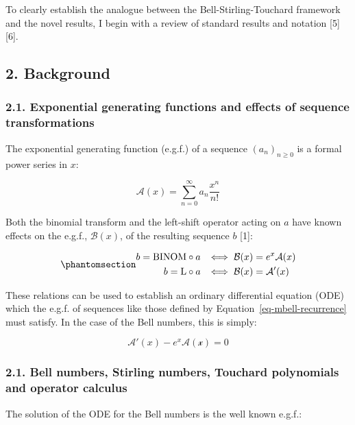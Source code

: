 \documentclass[
  letterpaper,
  DIV=11,
  numbers=noendperiod]{scrartcl}
\theoremstyle{plain}
\theoremstyle{remark}
\begin{document}
To clearly establish the analogue between the Bell-Stirling-Touchard
framework and the novel results, I begin with a review of standard
results and notation {[}5{]} {[}6{]}.

\subsection{2. Background}\label{background}

\subsubsection{2.1. Exponential generating functions and effects of
sequence
transformations}\label{exponential-generating-functions-and-effects-of-sequence-transformations}

The exponential generating function (e.g.f.) of a sequence
\((a_n)_{n \geq 0}\) is a formal power series in \(x\):

\[
\mathcal{A}(x) = \sum_{n=0}^\infty a_n \frac{x^n}{n!}
\]

Both the binomial transform and the left-shift operator acting on \(a\)
have known effects on the e.g.f., \(\mathcal{B}(x)\), of the resulting
sequence \(b\) {[}1{]}:

\begin{equation}\phantomsection\label{eq-egf-transform}{
\begin{aligned}
b = \mathrm{BINOM} \circ a \,\,\, &\iff \mathcal{B}(x) = e^x \mathcal{A}(x) \\
b = \mathrm{L} \circ a \,\,\, &\iff \mathcal{B}(x) = \mathcal{A}'(x)
\end{aligned}
}\end{equation}

These relations can be used to establish an ordinary differential
equation (ODE) which the e.g.f. of sequences like those defined by
Equation~\ref{eq-mbell-recurrence} must satisfy. In the case of the Bell
numbers, this is simply:

\[
\mathcal{A}'(x)-e^x \mathcal{A(x)} = 0
\]

\subsubsection{2.1. Bell numbers, Stirling numbers, Touchard polynomials
and operator
calculus}\label{bell-numbers-stirling-numbers-touchard-polynomials-and-operator-calculus}

The solution of the ODE for the Bell numbers is the well known e.g.f.:
\end{document}
